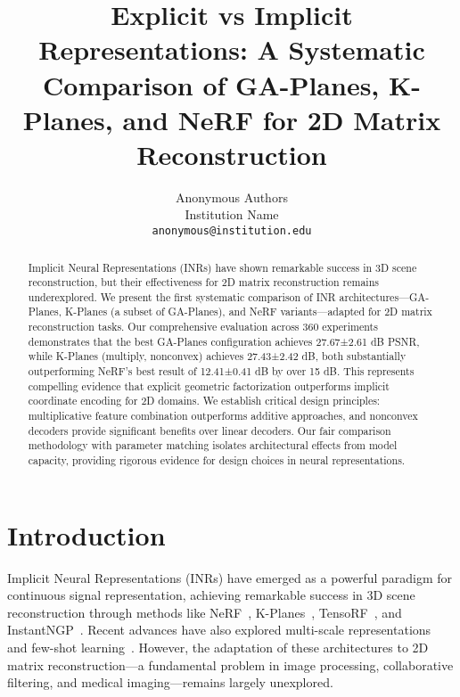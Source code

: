 \documentclass{article}
\begin{document}
\title{Explicit vs Implicit Representations: A Systematic Comparison of GA-Planes, K-Planes, and NeRF for 2D Matrix Reconstruction}

\author{%
  Anonymous Authors\\
  Institution Name\\
  \texttt{anonymous@institution.edu}
}

\maketitle

\begin{abstract}
    Implicit Neural Representations (INRs) have shown remarkable success in 3D scene reconstruction, but their effectiveness for 2D matrix reconstruction remains underexplored. We present the first systematic comparison of INR architectures—GA-Planes, K-Planes (a subset of GA-Planes), and NeRF variants—adapted for 2D matrix reconstruction tasks. Our comprehensive evaluation across 360 experiments demonstrates that the best GA-Planes configuration achieves 27.67±2.61 dB PSNR, while K-Planes (multiply, nonconvex) achieves 27.43±2.42 dB, both substantially outperforming NeRF's best result of 12.41±0.41 dB by over 15 dB. This represents compelling evidence that explicit geometric factorization outperforms implicit coordinate encoding for 2D domains. We establish critical design principles: multiplicative feature combination outperforms additive approaches, and nonconvex decoders provide significant benefits over linear decoders. Our fair comparison methodology with parameter matching isolates architectural effects from model capacity, providing rigorous evidence for design choices in neural representations.
\end{abstract}

\section{Introduction}

Implicit Neural Representations (INRs) have emerged as a powerful paradigm for continuous signal representation, achieving remarkable success in 3D scene reconstruction through methods like NeRF~\cite{mildenhall2020nerf}, K-Planes~\cite{fridovich2023kplanes}, TensoRF~\cite{chen2022tensorf}, and InstantNGP~\cite{muller2022instant}. Recent advances have also explored multi-scale representations~\cite{barron2021mipnerf} and few-shot learning~\cite{yu2021pixelnerf}. However, the adaptation of these architectures to 2D matrix reconstruction—a fundamental problem in image processing, collaborative filtering, and medical imaging—remains largely unexplored.
\end{document}
